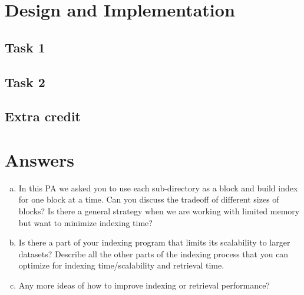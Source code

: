 
\usepackage{graphicx,amssymb,amsmath,enumerate}
\usepackage{courier}
\usepackage{color}
\usepackage{listings}
\usepackage{fancyvrb}
\usepackage{stmaryrd}

\oddsidemargin 0in
\evensidemargin 0in
\textwidth 6.5in
\topmargin -0.5in
\textheight 9.0in




\pagestyle{myheadings}  %

\section{Design and Implementation}

\subsection{Task 1}
\subsection{Task 2}
\subsection{Extra credit}


\section{Answers}

\begin{enumerate}[(a)]
\item 
In this PA we asked you to use each sub-directory as a block and build index
for one block at a time. Can you discuss the tradeoff of different sizes of
blocks? Is there a general strategy when we are working with limited memory
but want to minimize indexing time?

\item Is there a part of your indexing program that limits its scalability to larger
datasets? Describe all the other parts of the indexing process that you can
optimize for indexing time/scalability and retrieval time.

\item 
Any more ideas of how to improve indexing or retrieval performance?
\end{enumerate}





